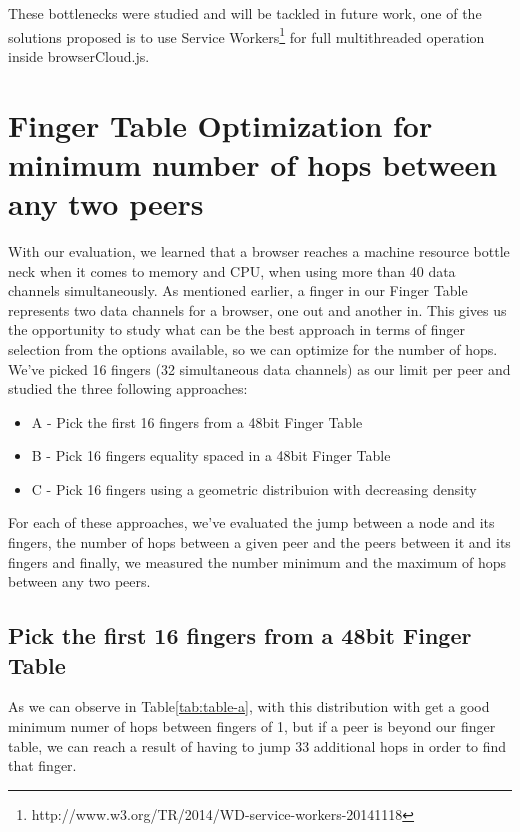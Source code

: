 These bottlenecks were studied and will be tackled in future work, one of the solutions proposed is to use Service Workers\footnote{http://www.w3.org/TR/2014/WD-service-workers-20141118} for full multithreaded operation inside browserCloud.js.

\section{Finger Table Optimization for minimum number of hops between any two peers}

With our evaluation, we learned that a browser reaches a machine resource bottle neck when it comes to memory and CPU, when using more than 40 data channels simultaneously. As mentioned earlier, a finger in our Finger Table represents two data channels for a browser, one out and another in. This gives us the opportunity to study what can be the best approach in terms of finger selection from the options available, so we can optimize for the number of hops. We've picked 16 fingers (32 simultaneous data channels) as our limit per peer and studied the three following approaches:

\begin{itemize}
    \item A - Pick the first 16 fingers from a 48bit Finger Table
    \item B - Pick 16 fingers equality spaced in a 48bit Finger Table
    \item C - Pick 16 fingers using a geometric distribuion with decreasing density
\end{itemize}

For each of these approaches, we've evaluated the jump between a node and its fingers, the number of hops between a given peer and the peers between it and its fingers and finally, we measured the number minimum and the maximum of hops between any two peers.

\subsection{Pick the first 16 fingers from a 48bit Finger Table}

As we can observe in Table\ref{tab:table-a}, with this distribution with get a good minimum numer of hops between fingers of 1, but if a peer is beyond our finger table, we can reach a result of having to jump 33 additional hops in order to find that finger.

